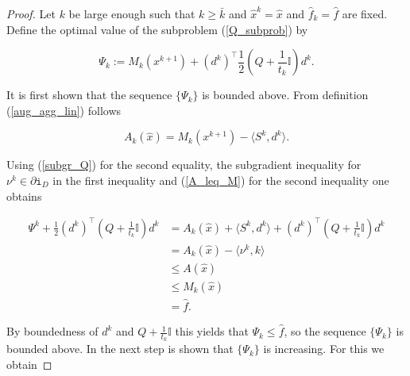 \begin{proof}
	Let \(k\) be large enough such that \(k \geq \bar{k}\) and \(\hat{x}^k = \hat{x}\) and \(\hat{f}_k=\hat{f}\) are fixed.
	Define the optimal value of the subproblem (\ref{Q_subprob}) by 
	
	\begin{equation}
		\Psi_k := M_k(x^{k+1})+\left(d^k\right)^{\top}\frac{1}{2}\left(Q+\frac{1}{t_k}\mathbb{I}\right)d^k.
		\label{Psi}
	\end{equation}
	
	It is first shown that the sequence \(\{\Psi_k\}\) is bounded above.
	From definition (\ref{aug_agg_lin}) follows

	
	\begin{equation*}
		A_k(\hat{x}) = M_k(x^{k+1})-\langle S^k,d^k \rangle.
	\end{equation*}
	
Using (\ref{subgr_Q}) for the second equality, the subgradient inequality for \(\nu^k \in \partial \mathtt{i}_{D}\) in the first inequality and (\ref{A_leq_M}) for the second inequality  one obtains
	
	\begin{align*}
		\Psi^k+\frac{1}{2}\left(d^{k}\right)^{\top}\left(Q+\frac{1}{t_k}\mathbb{I}\right)d^k &= A_k(\hat{x})+\langle S^k,d^k\rangle + \left(d^{k}\right)^{\top}\left(Q+\frac{1}{t_k}\mathbb{I}\right)d^k \\
		&= A_k(\hat{x})-\langle \nu^k,k \rangle \\
		&\leq A(\hat{x}) \\
		&\leq M_k(\hat{x}) \\
		& = \hat{f}.
	\end{align*}
	
By boundedness of \(d^k\) and \(Q+\frac{1}{t_k}\mathbb{I}\) this yields that \(\Psi_k \leq \hat{f}\), so the sequence \(\{\Psi_k\}\) is bounded above.
	In the next step is shown that \(\{\Psi_k\}\) is increasing. For this we obtain
	

\end{proof}
